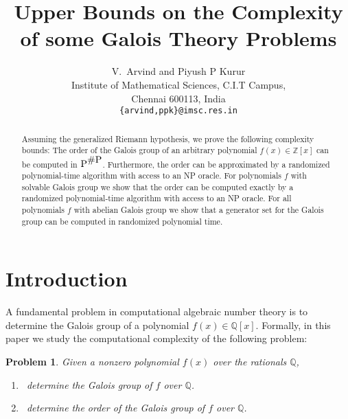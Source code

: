 \documentclass{article}
\title{Upper Bounds on the Complexity of some Galois Theory Problems}
\author{ V.~Arvind and Piyush P Kurur\\
  Institute of Mathematical Sciences, C.I.T Campus,\\
  Chennai 600113, India\\
  {\tt \{arvind,ppk\}@imsc.res.in}
}%
\newtheorem{problem}[theorem]{Problem}
\newcommand{\Q}[0]{\ensuremath{\mathbb{Q}}}
\newcommand{\Z}[0]{\ensuremath{\mathbb{Z}}}
\newcommand{\p}{\mbox{\rm P}}
\newcommand{\numP}{\mbox{\rm \#P}}
\begin{document}
\maketitle


\begin{abstract}
  Assuming the generalized Riemann hypothesis, we prove the following
  complexity bounds: The order of the Galois group of an arbitrary
  polynomial $f(x)\in\Z[x]$ can be computed in $\p^{\numP}$.
  Furthermore, the order can be approximated by a randomized
  polynomial-time algorithm with access to an NP oracle. For
  polynomials $f$ with solvable Galois group we show that the order
  can be computed exactly by a randomized polynomial-time algorithm
  with access to an NP oracle. For all polynomials $f$ with abelian
  Galois group we show that a  generator set for the Galois
  group can be computed in randomized polynomial time.
\end{abstract}

\section{Introduction}
A fundamental problem in computational algebraic number theory is to
determine the Galois group of a polynomial $f(x) \in \Q[x]$. Formally,
in this paper we study the computational complexity of the following
problem:

\begin{problem}\label{prob1}
Given a nonzero polynomial $f(x)$ over the rationals $\Q$, 
\begin{enumerate}
\item[(a)]~determine the Galois group of $f$ over $\Q$.
\item[(b)]~determine the order of the Galois group of $f$ over $\Q$. 
\end{enumerate}
\end{problem}
\end{document}
